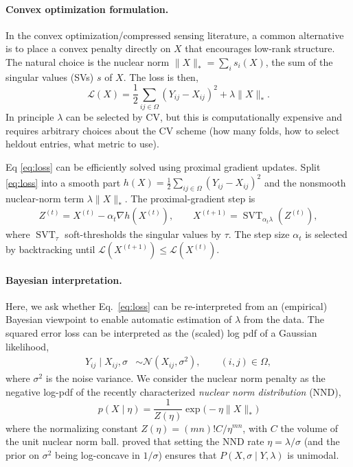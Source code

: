 \documentclass[11pt]{article}
\begin{document}
\paragraph{Convex optimization formulation.} In the convex optimization/compressed sensing literature, a common alternative is to place a convex penalty directly on $X$ that encourages low-rank structure. The natural choice is the nuclear norm $\|X\|_* = \sum_i s_i(X)$, the sum of the singular values (SVs) $s$ of $X$. The loss is then, 
\begin{equation} \label{eq:loss} \mathcal{L}(X) = \frac12 \sum_{ij \in \Omega} (Y_{ij}-X_{ij})^2 + \lambda \|X\|_*.
\end{equation}
In principle $\lambda$ can be selected by CV, but this is computationally expensive and requires arbitrary choices about the CV scheme (how many folds, how to select heldout entries, what metric to use). 

Eq \eqref{eq:loss} can be efficiently solved using proximal gradient updates. Split \eqref{eq:loss} into a smooth part $h(X) = \frac12 \sum_{ij \in \Omega} (Y_{ij}-X_{ij})^2 $ and the nonsmooth nuclear-norm term $\lambda\|X\|_*$.  The proximal-gradient step is
\begin{align} Z^{(t)} = X^{(t)} - \alpha_t\nabla h(X^{(t)}), \qquad X^{(t+1)} = \operatorname{SVT}_{\alpha_t\lambda}\!\left(Z^{(t)}\right), \label{eq:proxgrad}
\end{align}
where $\operatorname{SVT}_\tau$ soft-thresholds the singular values by $\tau$.
The step size $\alpha_t$ is selected by backtracking until
$\mathcal{L}(X^{(t+1)})\leq\mathcal{L}(X^{(t)})$.

\paragraph{Bayesian interpretation.} Here, we ask whether Eq.~\eqref{eq:loss} can be re-interpreted from an (empirical) Bayesian viewpoint to enable automatic estimation of $\lambda$ from the data. The squared error loss can be interpreted as the (scaled) log pdf of a Gaussian likelihood, 
\begin{align} Y_{ij} \mid X_{ij}, \sigma &\sim \mathcal{N}(X_{ij}, \sigma^2), \qquad (i,j)\in\Omega,
\end{align}
where $\sigma^2$ is the noise variance. 
We consider the nuclear norm penalty as the negative log-pdf of the recently characterized\cite{Segert2025-rk} \emph{nuclear norm distribution} (NND), 
\begin{equation} p(X \mid \eta) = \frac{1}{Z(\eta)} \exp\big(-\eta \|X\|_*\big)
\end{equation}
where the normalizing constant $Z(\eta)=(mn)! C / \eta^{mn}$, with $C$ the volume of the unit nuclear norm ball. 
\citet{Segert2025-rk} proved that setting the NND rate $\eta = \lambda/\sigma$ (and the prior on $\sigma^2$ being log-concave in $1/\sigma$) ensures that $P(X,\sigma\mid Y,\lambda)$ is unimodal.
\end{document}
